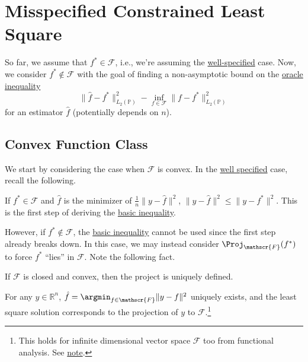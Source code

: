 \section{Misspecified Constrained Least Square}
So far, we assume that \(f^{\ast} \in \mathscr{F} \), i.e., we're assuming the \hyperref[def:well-specified]{well-specified} case. Now, we consider \(f^{\ast} \notin \mathscr{F} \) with the goal of finding a non-asymptotic bound on the \hyperref[eq:oracle-inequality]{oracle inequality}
\[
	\lVert \hat{f} - f^{\ast}  \rVert _{L_2(\mathbb{P} )}^2 - \inf _{f \in \mathscr{F} } \lVert f - f^{\ast}  \rVert _{L_2(\mathbb{P} )} ^2
\]
for an estimator \(\hat{f} \) (potentially depends on \(n\)).

\subsection{Convex Function Class}
We start by considering the case when \(\mathscr{F} \) is convex. In the \hyperref[def:well-specified]{well specified} case, recall the following.

\begin{prev}
	If \(f^{\ast} \in \mathscr{F} \) and \(\hat{f} \) is the minimizer of \(\frac{1}{n} \lVert y - \hat{f} \rVert ^2 \), \(\lVert y - \hat{f} \rVert ^2 \leq \lVert y - f^{\ast} \rVert ^2\). This is the first step of deriving the \hyperref[eq:basic-inequality]{basic inequality}.
\end{prev}

However, if \(f^{\ast} \notin \mathscr{F} \), the \hyperref[eq:basic-inequality]{basic inequality} cannot be used since the first step already breaks down. In this case, we may instead consider \(\Proj_{\mathscr{F} }(f^{\ast} ) \) to force \(f^{\ast} \) ``lies'' in \(\mathscr{F} \). Note the following fact.

\begin{note}
	If \(\mathscr{F} \) is closed and convex, then the project is uniquely defined.
\end{note}
\begin{explanation}
	For any \(y\in \mathbb{R} ^n\), \(\hat{f} = \argmin_{f\in \mathscr{F} } \lVert y - f \rVert ^2\) uniquely exists, and the least square solution corresponds to the projection of \(y\) to \(\mathscr{F} \).\footnote{This holds for infinite dimensional vector space \(\mathscr{F} \) too from functional analysis. See \href{https://pbb.wtf/posts/Notes\#functional-analysis-math602}{note}.}
\end{explanation}

